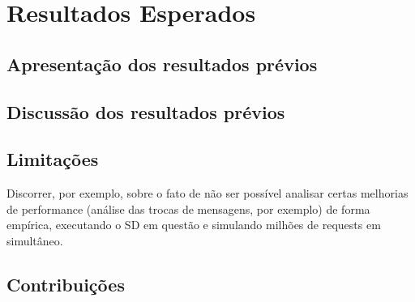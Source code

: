 
\chapter{Resultados Esperados}\label{cap:resultados}

\section{Apresentação dos resultados prévios}\label{sec:escopoSistema}

\section{Discussão dos resultados prévios}\label{sec:discussoes} 

\section{Limitações}\label{sec:limitacoes}

Discorrer, por exemplo, sobre o fato de não ser possível analisar certas melhorias de performance (análise das trocas de mensagens, por exemplo) de forma empírica, executando o SD em questão e simulando milhões de requests em simultâneo.

\section{Contribuições}\label{sec:contribuicoes}